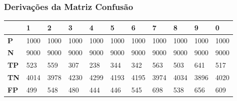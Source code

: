 \documentclass[a4paper]{article}
\begin{document}
\subsubsection{Derivações da Matriz Confusão}
\begin{table}[H]
    \centering
    \begin{tabular}{l|l|l|l|l|l|l|l|l|l|l|}
        \cline{2-11}
                                           & \textbf{1}                    & \textbf{2}                    & \textbf{3}                    & \textbf{4}                    & \textbf{5}                    & \textbf{6}                    & \textbf{7}                    & \textbf{8}                    & \textbf{9}                    & \textbf{0}                    \\ \hline
        \multicolumn{1}{|l|}{\textbf{P}}   & 1000                          & 1000                          & 1000                          & 1000                          & 1000                          & 1000                          & 1000                          & 1000                          & 1000                          & 1000                          \\ \hline
        \multicolumn{1}{|l|}{\textbf{N}}   & 9000                          & 9000                          & 9000                          & 9000                          & 9000                          & 9000                          & 9000                          & 9000                          & 9000                          & 9000                          \\ \hline
        \multicolumn{1}{|l|}{\textbf{TP}}  & 523                           & 559                           & 307                           & 238                           & 344                           & 342                           & 563                           & 503                           & 641                           & 517                           \\ \hline
        \multicolumn{1}{|l|}{\textbf{TN}}  & 4014                          & 3978                          & 4230                          & 4299                          & 4193                          & 4195                          & 3974                          & 4034                          & 3896                          & 4020                          \\ \hline
        \multicolumn{1}{|l|}{\textbf{FP}}  & 499                           & 548                           & 480                           & 444                           & 446                           & 545                           & 698                           & 538                           & 656                           & 609                           \\ \hline

\end{tabular}
\end{table}
\end{document}
